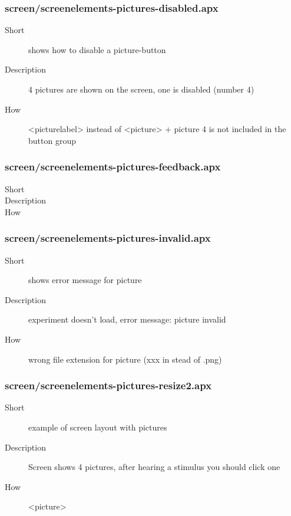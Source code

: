 \subsubsection{screen/screenelements-pictures-disabled.apx}
\begin{description}
\item[Short] 
 shows how to disable a picture-button
\item[Description] 
 4 pictures are shown on the screen, one is disabled (number 4)
\item[How] 
 \textless{}picturelabel\textgreater{} instead of \textless{}picture\textgreater{} + picture 4 is not included in the button group
\end{description}

\subsubsection{screen/screenelements-pictures-feedback.apx}
\begin{description}
\item[Short] 

\item[Description] 

\item[How] 

\end{description}

\subsubsection{screen/screenelements-pictures-invalid.apx}
\begin{description}
\item[Short] 
 shows error message for picture
\item[Description] 
 experiment doesn't load, error message: picture invalid
\item[How] 
 wrong file extension for picture (xxx in stead of .png)
\end{description}

\subsubsection{screen/screenelements-pictures-resize2.apx}
\begin{description}
\item[Short] 
 example of screen layout with pictures
\item[Description] 
 Screen shows 4 pictures, after hearing a stimulus you should click one
\item[How] 
 \textless{}picture\textgreater{}
\end{description}

